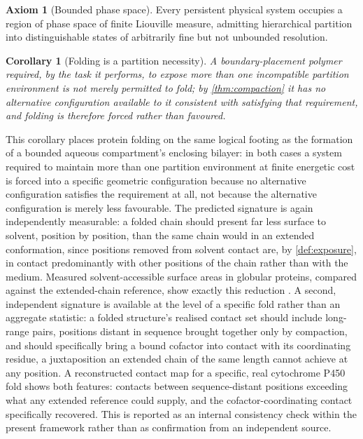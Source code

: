 \documentclass[11pt,twocolumn,a4paper]{article}
\theoremstyle{plain}
\newtheorem{corollary}[theorem]{Corollary}
\theoremstyle{definition}
\newtheorem{axiom}{Axiom}
\theoremstyle{remark}
\begin{document}
\begin{axiom}[Bounded phase space]
\label{ax:bounded}
Every persistent physical system occupies a region of phase space of finite
Liouville measure, admitting hierarchical partition into distinguishable
states of arbitrarily fine but not unbounded resolution.
\end{axiom}

\begin{corollary}[Folding is a partition necessity]
\label{cor:folding}
A boundary-placement polymer required, by the task it performs, to expose
more than one incompatible partition environment is not merely permitted to
fold; by \cref{thm:compaction} it has no alternative configuration
available to it consistent with satisfying that requirement, and folding is
therefore forced rather than favoured.
\end{corollary}

This corollary places protein folding on the same logical footing as the
formation of a bounded aqueous compartment's enclosing bilayer: in both
cases a system required to maintain more than one partition environment at
finite energetic cost is forced into a specific geometric configuration
because no alternative configuration satisfies the requirement at all, not
because the alternative configuration is merely less favourable. The
predicted signature is again independently measurable: a folded chain
should present far less surface to solvent, position by position, than the
same chain would in an extended conformation, since positions removed from
solvent contact are, by \cref{def:exposure}, in contact predominantly with
other positions of the chain rather than with the medium. Measured
solvent-accessible surface areas in globular proteins, compared against
the extended-chain reference, show exactly this reduction
\citep{miller1987,rose1985}. A second, independent signature is available
at the level of a specific fold rather than an aggregate statistic: a
folded structure's realised contact set should include long-range pairs,
positions distant in sequence brought together only by compaction, and
should specifically bring a bound cofactor into contact with its
coordinating residue, a juxtaposition an extended chain of the same
length cannot achieve at any position. A reconstructed contact map for a
specific, real cytochrome P450 fold shows both features: contacts between
sequence-distant positions exceeding what any extended reference could
supply, and the cofactor-coordinating contact specifically recovered.
This is reported as an internal consistency check within the present
framework rather than as confirmation from an independent source.
\end{document}
